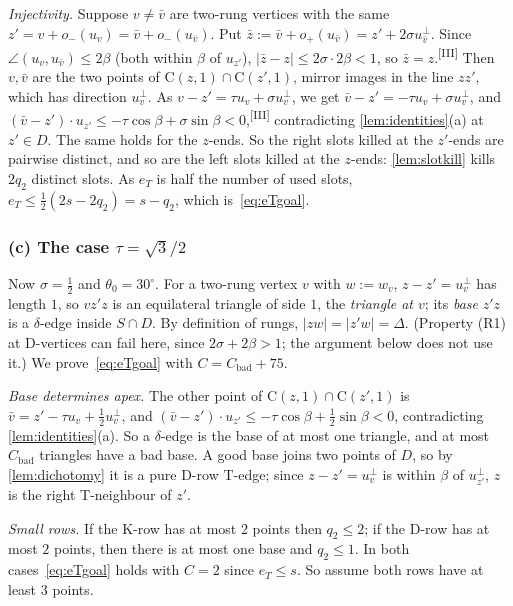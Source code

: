 \documentclass[11pt]{amsart}
\theoremstyle{definition}
\theoremstyle{remark}
\newcommand{\Cc}{\mathrm{C}}      %
\newcommand{\chk}[1]{\textsuperscript{[#1]}}
\begin{document}
\emph{Injectivity.} Suppose $v\neq\bar v$ are two-rung vertices with the same $z'=v+o_-(u_v)=\bar v+o_-(u_{\bar v})$. Put $\bar z:=\bar v+o_+(u_{\bar v})=z'+2\sigma u_{\bar v}^\perp$. Since $\angle(u_v,u_{\bar v})\le2\beta$ (both within $\beta$ of $u_{z'}$), $|\bar z-z|\le2\sigma\cdot2\beta<1$, so $\bar z=z$.\chk{III} Then $v,\bar v$ are the two points of $\Cc(z,1)\cap\Cc(z',1)$, mirror images in the line $zz'$, which has direction $u_v^\perp$. As $v-z'=\tau u_v+\sigma u_v^\perp$, we get $\bar v-z'=-\tau u_v+\sigma u_v^\perp$, and $(\bar v-z')\cdot u_{z'}\le-\tau\cos\beta+\sigma\sin\beta<0$,\chk{III} contradicting \cref{lem:identities}(a) at $z'\in D$. The same holds for the $z$-ends. So the right slots killed at the $z'$-ends are pairwise distinct, and so are the left slots killed at the $z$-ends: \cref{lem:slotkill} kills $2q_2$ distinct slots. As $e_T$ is half the number of used slots, $e_T\le\frac12(2s-2q_2)=s-q_2$, which is~\eqref{eq:eTgoal}.

\subsubsection*{(c) The case $\tau=\sqrt3/2$}
Now $\sigma=\frac12$ and $\theta_0=30^\circ$. For a two-rung vertex $v$ with $w:=w_v$, $z-z'=u_v^\perp$ has length $1$, so $vz'z$ is an equilateral triangle of side $1$, the \emph{triangle at $v$}; its \emph{base} $z'z$ is a $\delta$-edge inside $S\cap D$. By definition of rungs, $|zw|=|z'w|=\Delta$. (Property (R1) at D-vertices can fail here, since $2\sigma+2\beta>1$; the argument below does not use it.) We prove~\eqref{eq:eTgoal} with $C=C_{\mathrm{bad}}+75$.

\emph{Base determines apex.} The other point of $\Cc(z,1)\cap\Cc(z',1)$ is $\bar v=z'-\tau u_v+\frac12u_v^\perp$, and $(\bar v-z')\cdot u_{z'}\le-\tau\cos\beta+\frac12\sin\beta<0$, contradicting \cref{lem:identities}(a). So a $\delta$-edge is the base of at most one triangle, and at most $C_{\mathrm{bad}}$ triangles have a bad base. A good base joins two points of $D$, so by \cref{lem:dichotomy} it is a pure D-row T-edge; since $z-z'=u_v^\perp$ is within $\beta$ of $u_{z'}^\perp$, $z$ is the right T-neighbour of $z'$.

\emph{Small rows.} If the K-row has at most $2$ points then $q_2\le2$; if the D-row has at most $2$ points, then there is at most one base and $q_2\le1$. In both cases~\eqref{eq:eTgoal} holds with $C=2$ since $e_T\le s$. So assume both rows have at least $3$ points.
\end{document}
